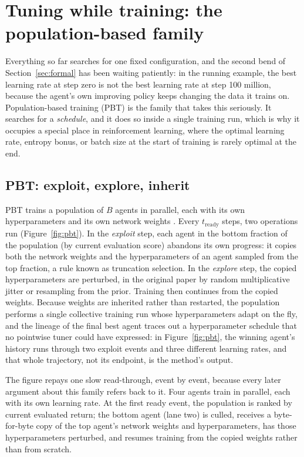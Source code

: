 \chapter{Tuning while training: the population-based family}
\label{sec:population}

Everything so far searches for one fixed configuration, and the second bend
of Section~\ref{sec:formal} has been waiting patiently: in the running
example, the best learning rate at step zero is not the best learning rate
at step 100 million, because the agent's own improving policy keeps changing
the data it trains on. Population-based training (PBT) is the family that
takes this seriously. It searches for a \emph{schedule}, and it does so
inside a single training run, which is why it occupies a special place in
reinforcement learning, where the optimal learning rate, entropy bonus, or
batch size at the start of training is rarely optimal at the end.

\section{PBT: exploit, explore, inherit}

PBT trains a population of $B$ agents in parallel, each with its own
hyperparameters and its own network weights \citep{jaderberg2017pbt}. Every
$t_{\mathrm{ready}}$ steps, two operations run
(Figure~\ref{fig:pbt}). In the \emph{exploit} step, each agent in the
bottom fraction of the population (by current evaluation score) abandons
its own progress: it copies both the network weights and the
hyperparameters of an agent sampled from the top fraction, a rule known as
truncation selection. In the \emph{explore} step, the copied
hyperparameters are perturbed, in the original paper by random
multiplicative jitter or resampling from the prior. Training then
continues from the copied weights. Because weights are inherited rather
than restarted, the population performs a single collective training run
whose hyperparameters adapt on the fly, and the lineage of the final best
agent traces out a hyperparameter schedule that no pointwise tuner could
have expressed: in Figure~\ref{fig:pbt}, the winning agent's history runs
through two exploit events and three different learning rates, and that
whole trajectory, not its endpoint, is the method's output.

The figure repays one slow read-through, event by event, because every
later argument about this family refers back to it. Four agents train
in parallel, each with its own learning rate. At the first ready event,
the population is ranked by current evaluated return; the bottom agent
(lane two) is culled, receives a byte-for-byte copy of the top agent's
network weights and hyperparameters, has those hyperparameters
perturbed, and resumes training from the copied weights rather than
from scratch.

